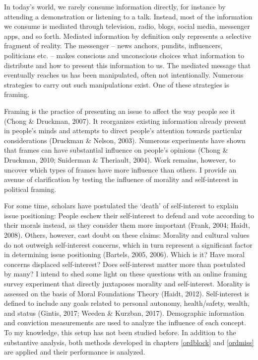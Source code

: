 \documentclass[12pt,econ]{sources/authesis}
\begin{document}
In today's world, we rarely consume information directly, for instance by attending a demonstration or listening to a talk. Instead, most of the information we consume is mediated through television, radio, blogs, social media, messenger apps, and so forth. Mediated information by definition only represents a selective fragment of reality. The messenger -- news anchors, pundits, influencers, politicians etc. -- makes conscious and unconscious choices what information to distribute and how to present this information to us. The mediated message that eventually reaches us has been manipulated, often not intentionally. Numerous strategies to carry out such manipulations exist. One of these strategies is framing.

Framing is the practice of presenting an issue to affect the way people see it (Chong \& Druckman, 2007). It reorganizes existing information already present in people's minds and attempts to direct people's attention towards particular considerations (Druckman \& Nelson, 2003). Numerous experiments have shown that frames can have substantial influence on people's opinions (Chong \& Druckman, 2010; Sniderman \& Theriault, 2004). Work remains, however, to uncover which types of frames have more influence than others. I provide an avenue of clarification by testing the influence of morality and self-interest in political framing.

For some time, scholars have postulated the `death' of self-interest to explain issue positioning: People eschew their self-interest to defend and vote according to their morals instead, as they consider them more important (Frank, 2004; Haidt, 2008). Others, however, cast doubt on these claims: Morality and cultural values do not outweigh self-interest concerns, which in turn represent a significant factor in determining issue positioning (Bartels, 2005, 2006). Which is it? Have moral concerns displaced self-interest? Does self-interest matter more than postulated by many? I intend to shed some light on these questions with an online framing survey experiment that directly juxtaposes morality and self-interest. Morality is assessed on the basis of Moral Foundations Theory (Haidt, 2012). Self-interest is defined to include any goals related to personal autonomy, health/safety, wealth, and status (Gintis, 2017; Weeden \& Kurzban, 2017). Demographic information and conviction measurements are used to analyze the influence of each concept. To my knowledge, this setup has not been studied before. In addition to the substantive analysis, both methods developed in chapters \ref{ordblock} and \ref{ordmiss} are applied and their performance is analyzed.
\end{document}
